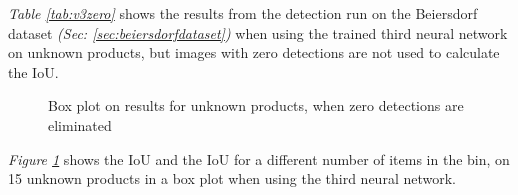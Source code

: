 \textit{Table \ref{tab:v3zero}} shows the results from the detection run on the Beiersdorf dataset \textit{(Sec: \ref{sec:beiersdorfdataset})} when using the trained third neural network on unknown products, but images with zero detections are not used to calculate the IoU. 

\begin{figure}[h]
 \centering
 \hfill
 \caption{Box plot on results for unknown products, when zero detections are eliminated}
 \label{fig:v3zerofig}
\end{figure}

\textit{Figure \ref{fig:v3zerofig}} shows the IoU and the IoU for a different number of items in the bin, on 15 unknown products in a box plot when using the third neural network.

\clearpage

